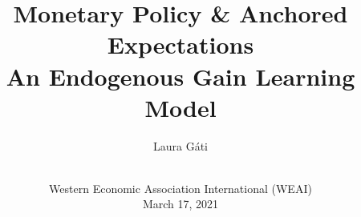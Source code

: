 \documentclass[10pt]{beamer}
\author[Laura G\'ati]{Laura G\'ati}
\institute[Boston College]{Boston College}
\title[Monetary Policy \& Anchored Expectations]{Monetary Policy \& Anchored Expectations \\
An Endogenous Gain Learning Model}
\date[]{\\Western Economic Association International (WEAI) \\
\vspace{0.2cm}
March 17, 2021}
\begin{document}
\begin{frame}[plain] %

\maketitle

\end{frame}




%	
%
%
%
\end{document}
